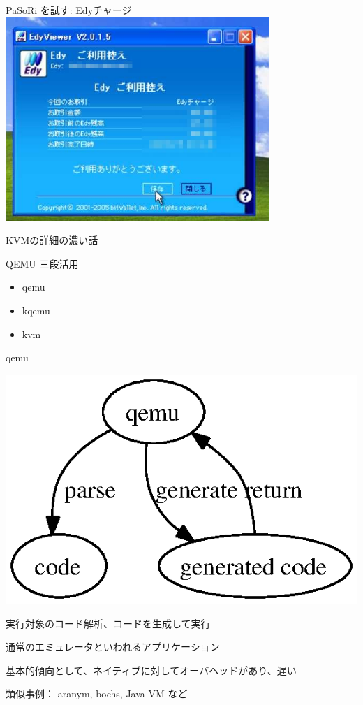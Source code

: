 \documentclass[cjk,dvipdfmx]{beamer}
\begin{document}
\begin{frame}{PaSoRi を試す: Edyチャージ}
\includegraphics[width=10cm]{image200703/edy2.jpg}
\end{frame}

\begin{frame}{KVMの詳細の濃い話}

QEMU 三段活用
\begin{itemize}
 \item qemu
 \item kqemu
 \item kvm
\end{itemize}
\end{frame}

\begin{frame}{qemu}
\begin{minipage}[]{0.4\hsize}
  \includegraphics[width=0.9\hsize]{image200703/qemu.eps}
\end{minipage}
\begin{minipage}[]{0.55\hsize}
 実行対象のコード解析、コードを生成して実行

 通常のエミュレータといわれるアプリケーション

 基本的傾向として、ネイティブに対してオーバヘッドがあり、遅い

類似事例：
 aranym, bochs, 
 Java VM など
\end{minipage}
\end{frame}
\end{document}
